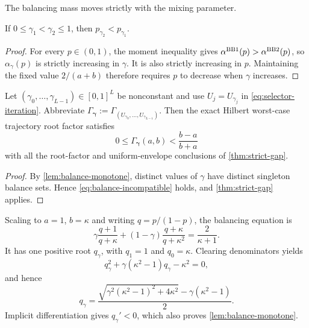 \documentclass[letterpaper,twoside]{article}
\begin{document}
The balancing mass moves strictly with the mixing parameter.

\begin{lemma}\label{lem:balance-monotone}
If $0\le\gamma_1<\gamma_2\le1$, then
$p_{\gamma_2}<p_{\gamma_1}$.
\end{lemma}

\begin{proof}
For every $p\in(0,1)$, the moment inequality gives
$\alpha^{\rm BB1}(p)>\alpha^{\rm BB2}(p)$, so $\alpha_\gamma(p)$ is strictly
increasing in $\gamma$.  It is also strictly increasing in $p$.  Maintaining the fixed
value $2/(a+b)$ therefore requires $p$ to decrease when $\gamma$ increases.
\end{proof}

\begin{theorem}\label{thm:periodic-mixing}
Let $(\gamma_0,\ldots,\gamma_{L-1})\in[0,1]^L$ be nonconstant and use
$U_j=U_{\gamma_j}$ in \eqref{eq:selector-iteration}.  Abbreviate
$\Gamma_{\bm\gamma}:=\Gamma_{(U_{\gamma_0},\ldots,U_{\gamma_{L-1}})}$.
Then the exact Hilbert worst-case trajectory root factor satisfies
\begin{equation}\label{eq:mixing-gap}
 0\le\Gamma_{\bm\gamma}(a,b)<\frac{b-a}{b+a}
\end{equation}
with all the root-factor and uniform-envelope conclusions of
\cref{thm:strict-gap}.
\end{theorem}

\begin{proof}
By \cref{lem:balance-monotone}, distinct values of $\gamma$ have distinct
singleton balance sets.  Hence \eqref{eq:balance-incompatible} holds, and
\cref{thm:strict-gap} applies.
\end{proof}

Scaling to $a=1$, $b=\kappa$ and writing
$q=p/(1-p)$, the balancing equation is
\begin{equation}\label{eq:qgamma}
 \gamma\frac{q+1}{q+\kappa}
 +(1-\gamma)\frac{q+\kappa}{q+\kappa^2}
 =\frac2{\kappa+1}.
\end{equation}
It has one positive root $q_\gamma$, with
$q_1=1$ and $q_0=\kappa$.  Clearing denominators yields
\[
 q_\gamma^2+\gamma(\kappa^2-1)q_\gamma-\kappa^2=0,
\]
and hence
\begin{equation}\label{eq:qgamma-closed}
 q_\gamma=
 \frac{\sqrt{\gamma^2(\kappa^2-1)^2+4\kappa^2}
       -\gamma(\kappa^2-1)}{2}.
\end{equation}
Implicit differentiation gives $q_\gamma'<0$, which also proves
\cref{lem:balance-monotone}.
\end{document}

